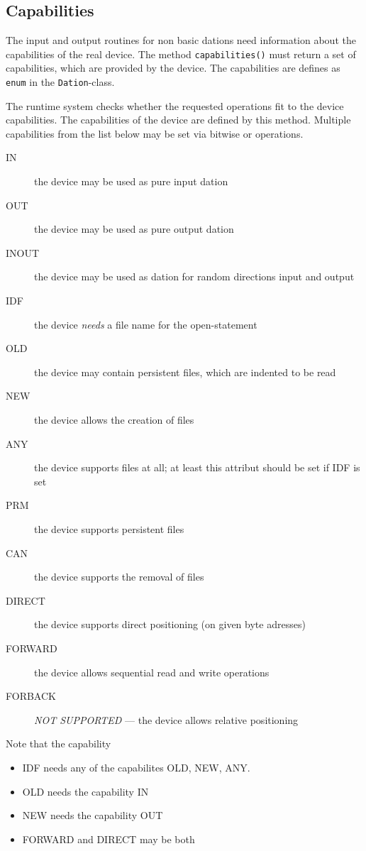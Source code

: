 \subsection{Capabilities}
The input and output routines for non basic dations 
need information about the capabilities of the
real device. The method \verb|capabilities()| must return a set of
capabilities, which are provided by the device. The capabilities are
defines as \verb|enum| in the \verb|Dation|-class.

The runtime system checks whether the requested operations fit to the 
device capabilities. The capabilities of the device are defined by this
method. Multiple capabilities from the list below may be set via bitwise
or operations.

\begin{description}
\item[IN] the device may be used as pure input dation
\item[OUT] the device may be used as pure output dation
\item[INOUT] the device may be used as dation for random directions
    input and output
\item[IDF] the device {\em needs} a file name for the open-statement
\item[OLD] the device may contain persistent files,
          which are indented to be read
\item[NEW] the device allows the creation of files 
\item[ANY] the device  supports files at all; at least 
            this attribut should be set if IDF is set
\item[PRM] the device supports persistent files
\item[CAN] the device supports the removal of files
\item[DIRECT] the device supports direct positioning (on given byte adresses)
\item[FORWARD] the device allows sequential read and write operations
\item[FORBACK] {\em NOT SUPPORTED} --- the device allows relative positioning
\end{description}
Note that the capability
\begin{itemize}
\item IDF needs any of the capabilites OLD, NEW, ANY.
\item OLD needs the capability IN
\item NEW needs the capability OUT
\item FORWARD and DIRECT may be both
\end{itemize}

